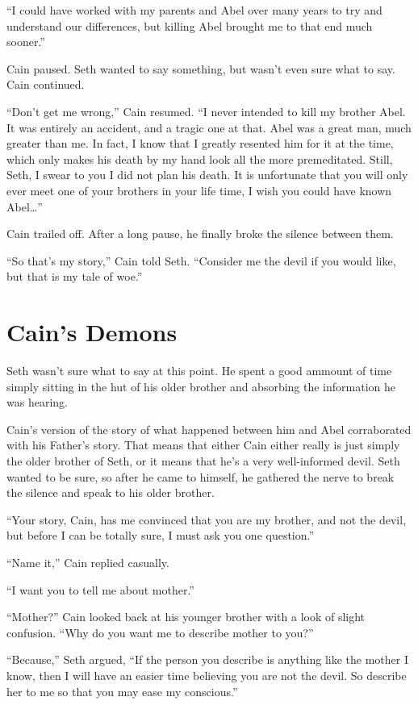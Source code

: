 \documentclass[12pt,twoside,titlepage]{report}
\begin{document}
``I could have worked with my parents and Abel over many years to try
and understand our differences, but killing Abel brought me to that end
much sooner.''

Cain paused. Seth wanted to say something, but wasn't even sure what to
say. Cain continued.

``Don't get me wrong,'' Cain resumed. ``I never intended to kill my
brother Abel. It was entirely an accident, and a tragic one at that.
Abel was a great man, much greater than me. In fact, I know that I
greatly resented him for it at the time, which only makes his death by
my hand look all the more premeditated. Still, Seth, I swear to you I
did not plan his death. It is unfortunate that you will only ever meet
one of your brothers in your life time, I wish you could have known
Abel\ldots{}''

Cain trailed off. After a long pause, he finally broke the silence
between them.

``So that's my story,'' Cain told Seth. ``Consider me the devil if you
would like, but that is my tale of woe.''

\hypertarget{cains-demons}{%
\chapter{Cain's Demons}\label{cains-demons}}

Seth wasn't sure what to say at this point. He spent a good ammount of
time simply sitting in the hut of his older brother and absorbing the
information he was hearing.

Cain's version of the story of what happened between him and Abel
corraborated with his Father's story. That means that either Cain either
really is just simply the older brother of Seth, or it means that he's a
very well-informed devil. Seth wanted to be sure, so after he came to
himself, he gathered the nerve to break the silence and speak to his
older brother.

``Your story, Cain, has me convinced that you are my brother, and not
the devil, but before I can be totally sure, I must ask you one
question.''

``Name it,'' Cain replied casually.

``I want you to tell me about mother.''

``Mother?'' Cain looked back at his younger brother with a look of
slight confusion. ``Why do you want me to describe mother to you?''

``Because,'' Seth argued, ``If the person you describe is anything like
the mother I know, then I will have an easier time believing you are not
the devil. So describe her to me so that you may ease my conscious.''
\end{document}
